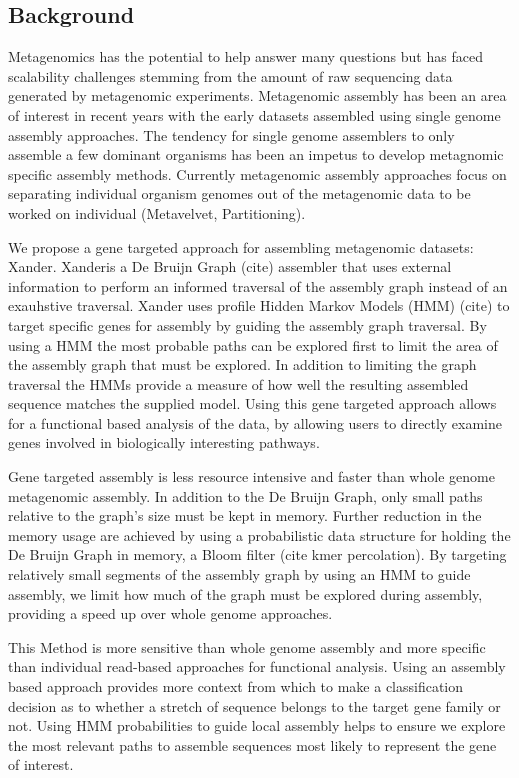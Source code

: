 \documentclass[10pt]{bmc_article}
\newenvironment{bmcformat}{\begin{raggedright}\baselineskip20pt\sloppy\setboolean{publ}{false}}{\end{raggedright}\baselineskip20pt\sloppy}
\begin{document}
\begin{bmcformat}
\section*{Background}
Metagenomics has the potential to help answer many questions but has faced scalability challenges stemming from the amount of raw sequencing data generated by metagenomic experiments.  Metagenomic assembly has been an area of interest in recent years with the early datasets assembled using single genome assembly approaches.  The tendency for single genome assemblers to only assemble a few dominant organisms has been an impetus to develop metagnomic specific assembly methods.  Currently metagenomic assembly approaches focus on separating individual organism genomes out of the metagenomic data to be worked on individual (Metavelvet, Partitioning).  

We propose a gene targeted approach for assembling metagenomic datasets: Xander.  Xanderis a De Bruijn Graph (cite) assembler that uses external information to perform an informed traversal of the assembly graph instead of an exauhstive traversal.  Xander uses profile Hidden Markov Models (HMM) (cite) to target specific genes for assembly by guiding the assembly graph traversal. By using a HMM the most probable paths can be explored first to limit the area of the assembly graph that must be explored.  In addition to limiting the graph traversal the HMMs provide a measure of how well the resulting assembled sequence matches the supplied model.  Using this gene targeted approach allows for a functional based analysis of the data, by allowing users to directly examine genes involved in biologically interesting pathways.

Gene targeted assembly is less resource intensive and faster than whole genome metagenomic assembly.  In addition to the De Bruijn Graph, only small paths relative to the graph's size must be kept in memory.  Further reduction in the memory usage are achieved by using a probabilistic data structure for holding the De Bruijn Graph in memory, a Bloom filter \cite{Bloom1970} (cite kmer percolation).  By targeting relatively small segments of the assembly graph by using an HMM to guide assembly, we limit how much of the graph must be explored during assembly, providing a speed up over whole genome approaches.

This Method is more sensitive than whole genome assembly and more specific than individual read-based approaches for functional analysis.  Using an assembly based approach provides more context from which to make a classification decision as to whether a stretch of sequence belongs to the target gene family or not.  Using HMM probabilities to guide local assembly helps to ensure we explore the most relevant paths to assemble sequences most likely to represent the gene of interest.
 

\end{bmcformat}
\end{document}
